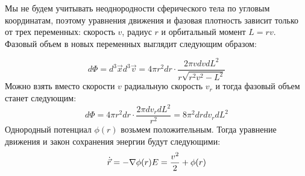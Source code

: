 Мы не будем учитывать неоднородности сферического тела по угловым координатам, поэтому уравнения движения и фазовая плотность зависит только от трех переменных: скорость $v$, радиус $r$ и орбитальный момент $L=rv$.
Фазовый объем в новых переменных выглядит следующим образом:



\begin{equation}
\label{eq:phase_volume_v}
d\Phi = d^{3}\vec{x}d^{3}\vec{v} = 4\pi r^{2}dr \cdot \frac{2\pi vdvdL^{2}}{r\sqrt{r^{2}v^{2} - L^{2}}}
\end{equation}
Можно взять вместо скорости $v$ радиальную скорость $v_r$ и тогда фазовый объем станет следующим:
\begin{equation}
\label{eq:phase_volume_v_r}
	d\Phi = 4\pi r^{2}dr \cdot \frac{2\pi dv_{r}dL^{2}}{r^{2}} = 8\pi^{2}drdv_{r}dL^{2}
\end{equation}
Однородный потенциал $\phi(r)$ возьмем положительным. Тогда уравнение движения и закон сохранения энергии будут следующими:
\begin{equation}
\label{eq:phase_volume_v_r}
	\dot{\vec{r}}= - \nabla\phi(r) \\
	E = \frac{v^{2}}{2} + \phi(r)
\end{equation}
